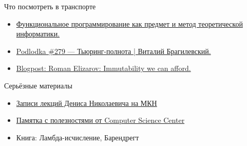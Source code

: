 
    \begin{frame}{Что посмотреть в транспорте}
        \begin{itemize}
            \item \href{https://youtu.be/oiUO1L4TOLI}{\color{blue} Функциональное программирование как предмет и метод теоретической информатики.}
            \item \href{https://youtu.be/YWelsG4mbik}{\color{blue} Podlodka \#279 --- Тьюринг-полнота | Виталий Брагилевский.}
            \item \href{https://elizarov.medium.com/immutability-we-can-afford-10c0dcb8351d}{\color{blue} Blogpost: Roman Elizarov: Immutability we can afford.}
        \end{itemize}
    \end{frame}

    \begin{frame}{Серьёзные материалы}
        \begin{itemize}
            \item \href{https://www.youtube.com/playlist?list=PL-_cKNuVAYAVX_q9XOKoFm95234G6YfOj}{\color{blue} Записи лекций Дениса Николаевича на МКН}
            \item \href{https://compscicenter.notion.site/compscicenter/b6dddf00bc7d497298179a3bdbdda375}{\color{blue}Памятка с полезностями от Computer Science Center}
            \item Книга: Ламбда-исчисление, Барендрегт
        \end{itemize}
    \end{frame}


